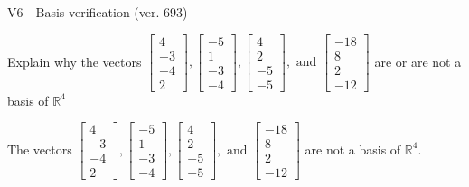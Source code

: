 \begin{exercise}
  \begin{exerciseTitle}V6 - Basis verification (ver. 693)\end{exerciseTitle}
  \begin{exerciseStatement}
    Explain why the vectors \(\left[\begin{array}{r}
4 \\
-3 \\
-4 \\
2
\end{array}\right] , \left[\begin{array}{r}
-5 \\
1 \\
-3 \\
-4
\end{array}\right] , \left[\begin{array}{r}
4 \\
2 \\
-5 \\
-5
\end{array}\right] , \text{ and } \left[\begin{array}{r}
-18 \\
8 \\
2 \\
-12
\end{array}\right]\) are or are not a basis of \(\mathbb{R}^4\)	


  \end{exerciseStatement}
  \begin{exerciseAnswer}
   The vectors \(\left[\begin{array}{r}
4 \\
-3 \\
-4 \\
2
\end{array}\right] , \left[\begin{array}{r}
-5 \\
1 \\
-3 \\
-4
\end{array}\right] , \left[\begin{array}{r}
4 \\
2 \\
-5 \\
-5
\end{array}\right] , \text{ and } \left[\begin{array}{r}
-18 \\
8 \\
2 \\
-12
\end{array}\right]\) 
  	 are not  a basis of \(\mathbb{R}^4\).
  


  \end{exerciseAnswer}
\end{exercise}